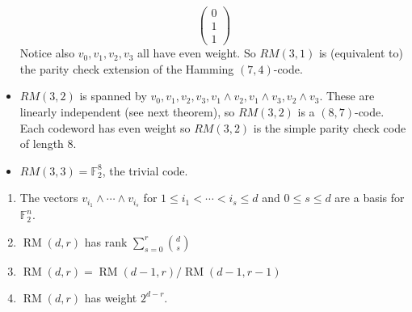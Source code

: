 \documentclass{article}
\newcommand{\F}{\mathbb{F}}
\newcommand{\1}[1]{\mathbbm{1}_{#1}}
\DeclareMathOperator{\RM}{RM}
\begin{document}
\begin{eg}
\begin{itemize}
\begin{equation*}
            \begin{pmatrix}0 \\ 1 \\ 1\end{pmatrix}
            \end{equation*}
            Notice also $v_0, v_1, v_2, v_3$ all have even weight. So $RM(3, 1)$ is (equivalent to) the parity check extension of the Hamming $(7, 4)$-code.
        \item $RM(3, 2)$ is spanned by $v_0, v_1, v_2, v_3, v_1 \wedge v_2, v_1 \wedge v_3, v_2 \wedge v_3$.
            These are linearly independent (see next theorem), so $RM(3, 2)$ is a $(8, 7)$-code.
            Each codeword has even weight so $RM(3, 2)$ is the simple parity check code of length $8$.
        \item $RM(3, 3) = \F_2^8$, the trivial code.
    \end{itemize}
\end{eg}
\begin{nthm}\label{thm:2.26}\leavevmode
    \begin{enumerate}[label=(\roman*)]
        \item The vectors $v_{i_1} \wedge \dotsb \wedge v_{i_s}$ for $1 \leq i_1 < \dotsb < i_s \leq d$ and $0 \leq s \leq d$ are a basis for $\F_2^n$.
        \item $\RM(d, r)$ has rank $\sum_{s=0}^r \binom{d}{s}$
        \item $\RM(d, r) = \RM(d-1, r)/\RM(d-1, r-1)$
        \item $\RM(d, r)$ has weight $2^{d-r}$.
    \end{enumerate}
\end{nthm}
\end{document}
